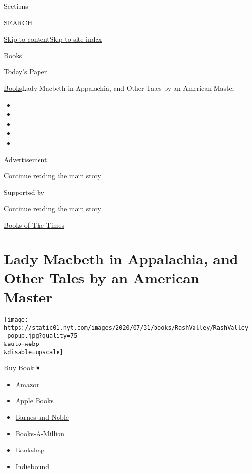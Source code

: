 Sections

SEARCH

\protect\hyperlink{site-content}{Skip to
content}\protect\hyperlink{site-index}{Skip to site index}

\href{https://www.nytimes.com/section/books}{Books}

\href{https://myaccount.nytimes.com/auth/login?response_type=cookie\&client_id=vi}{}

\href{https://www.nytimes.com/section/todayspaper}{Today's Paper}

\href{/section/books}{Books}\textbar{}Lady Macbeth in Appalachia, and
Other Tales by an American Master

\begin{itemize}
\item
\item
\item
\item
\item
\end{itemize}

Advertisement

\protect\hyperlink{after-top}{Continue reading the main story}

Supported by

\protect\hyperlink{after-sponsor}{Continue reading the main story}

\href{/column/books-of-the-times}{Books of The Times}

\hypertarget{lady-macbeth-in-appalachia-and-other-tales-by-an-american-master}{%
\section{Lady Macbeth in Appalachia, and Other Tales by an American
Master}\label{lady-macbeth-in-appalachia-and-other-tales-by-an-american-master}}

\texttt{[image: https://static01.nyt.com/images/2020/07/31/books/RashValley/RashValley-popup.jpg?quality=75\\\&auto=webp\\\&disable=upscale]}

Buy Book ▾

\begin{itemize}
\tightlist
\item
  \href{https://www.amazon.com/gp/search?index=books\&tag=NYTBSREV-20\&field-keywords=In+the+Valley+Ron+Rash}{Amazon}
\item
  \href{https://du-gae-books-dot-nyt-du-prd.appspot.com/buy?title=In+the+Valley\&author=Ron+Rash}{Apple
  Books}
\item
  \href{https://www.anrdoezrs.net/click-7990613-11819508?url=https\%3A\%2F\%2Fwww.barnesandnoble.com\%2Fw\%2F\%3Fean\%3D9780385544290}{Barnes
  and Noble}
\item
  \href{https://www.anrdoezrs.net/click-7990613-35140?url=https\%3A\%2F\%2Fwww.booksamillion.com\%2Fp\%2FIn\%2Bthe\%2BValley\%2FRon\%2BRash\%2F9780385544290}{Books-A-Million}
\item
  \href{https://bookshop.org/a/3546/9780385544290}{Bookshop}
\item
  \href{https://www.indiebound.org/book/9780385544290?aff=NYT}{Indiebound}
\end{itemize}

